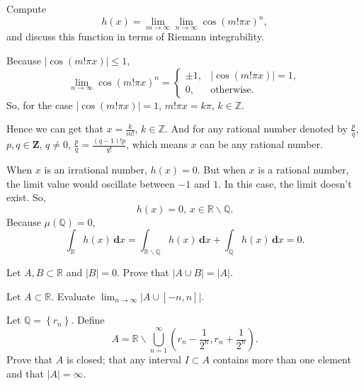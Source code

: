 \documentclass[en, normal, 11pt, black]{elegantnote}
\newenvironment{exercise}[1]{\begin{tcolorbox}[colback=black!15, colframe=black!80, breakable, title=#1]}{\end{tcolorbox}}
\newenvironment{solution}{\begin{tcolorbox}[colback=white, colframe=black!50, breakable, title=Solution. ]\setlength{\parskip}{0.8em}}{\end{tcolorbox}}
\newcommand{\der}{\,\mathbf{d}}
\begin{document}
\begin{exercise}{(4), }
    Compute
    \[
        h(x)=\lim _{m \rightarrow \infty} \lim _{n \rightarrow \infty} \cos (m ! \pi x)^{n}, 
    \]
    and discuss this function in terms of Riemann integrability.
\end{exercise}
\begin{solution}
    Because $|\cos(m!\pi x)|\leqslant1$, 
    \[
        \lim_{n\to\infty}\cos(m!\pi x)^n=
        \begin{cases}
            \pm 1, & |\cos(m!\pi x)|=1, \\
            0, & \text{otherwise}. 
        \end{cases}
    \]
    So, for the case $|\cos(m!\pi x)|=1$, $m!\pi x=k\pi$, $k\in\mathbb{Z}$. 
    
    Hence we can get that $x=\frac{k}{m!}$, $k\in\mathbb{Z}$. And for any rational number denoted by $\frac{p}{q}$, $p,q\in\mathbf{Z}$, $q\not=0$, $\frac{p}{q}=\frac{(q-1)!p}{q!}$, which means $x$ can be any rational number. 
    
    When $x$ is an irrational number, $h(x)=0$.  But when $x$ is a rational number, the limit value would oscillate between $-1$ and $1$. In this case, the limit doesn't exist. So, 
    \[
        h(x)=0, \, x\in\mathbb{R}\backslash\mathbb{Q}. 
    \]
    Because $\mu(\mathbb{Q})=0$, 
    \[
        \int_\mathbb{R}h(x)\der x=\int_{\mathbb{R}\backslash\mathbb{Q}}h(x)\der x+\int_\mathbb{Q}h(x)\der x=0. 
    \]
\end{solution}

\begin{exercise}{(5), }
    Let $A, B \subset \mathbb{R}$ and $|B|=0 .$ Prove that $|A \cup B|=|A|$. 
\end{exercise}

\begin{exercise}{(6), }
    Let $A \subset \mathbb{R}$. Evaluate $\lim _{n \rightarrow \infty}|A \cup[-n, n]|$. 
\end{exercise}

\begin{exercise}{(7), }
    Let $\mathbb{Q}=\left\{r_{n}\right\}$. Define
    \[
        A=\mathbb{R} \backslash \bigcup_{n=1}^{\infty}\left(r_{n}-\frac{1}{2^{n}}, r_{n}+\frac{1}{2^{n}}\right). 
    \]
    Prove that $A$ is closed; that any interval $I \subset A$ contains more than one element and that $|A|=\infty$. 
\end{exercise}
\end{document}
